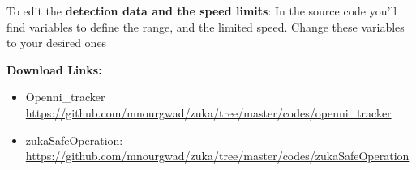 To edit the \textbf{detection data and the speed limits}:
\newline In the source code you’ll find variables to define the range, and the limited speed. Change these variables to your desired ones
\vspace{0.5cm}

\textbf{Download Links:}


\begin{itemize}
	\item Openni\_tracker \newline \url{
		https://github.com/mnourgwad/zuka/tree/master/codes/openni_tracker }
	
	\item	zukaSafeOperation: \newline \url{
		https://github.com/mnourgwad/zuka/tree/master/codes/zukaSafeOperation }
\end{itemize}